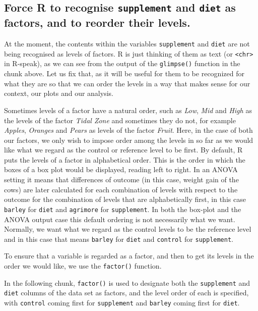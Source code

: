 \documentclass[
  letterpaper,
  DIV=11,
  numbers=noendperiod]{scrreprt}
\begin{document}
\subsection{\texorpdfstring{Force R to recognise \texttt{supplement} and
\texttt{diet} as factors, and to reorder their
levels.}{Force R to recognise supplement and diet as factors, and to reorder their levels.}}\label{force-r-to-recognise-supplement-and-diet-as-factors-and-to-reorder-their-levels.}

At the moment, the contents within the variables \texttt{supplement} and
\texttt{diet} are not being recognised as levels of factors. R is just
thinking of them as text (or \texttt{\textless{}chr\textgreater{}} in
R-speak), as we can see from the output of the \texttt{glimpse()}
function in the chunk above. Let us fix that, as it will be useful for
them to be recognized for what they are so that we can order the levels
in a way that makes sense for our context, our plots and our analysis.

Sometimes levels of a factor have a natural order, such as \emph{Low},
\emph{Mid} and \emph{High} as the levels of the factor \emph{Tidal Zone}
and sometimes they do not, for example \emph{Apples}, \emph{Oranges} and
\emph{Pears} as levels of the factor \emph{Fruit}. Here, in the case of
both our factors, we only wish to impose order among the levels in so
far as we would like what we regard as the control or reference level to
be first. By default, R puts the levels of a factor in alphabetical
order. This is the order in which the boxes of a box plot would be
displayed, reading left to right. In an ANOVA setting it means that
differences of outcome (in this case, weight gain of the cows) are later
calculated for each combination of levels with respect to the outcome
for the combination of levels that are alphabetically first, in this
case \texttt{barley} for \texttt{diet} and \texttt{agrimore} for
\texttt{supplement}. In both the box-plot and the ANOVA output case this
default ordering is not necessarily what we want. Normally, we want what
we regard as the control levels to be the reference level and in this
case that means \texttt{barley} for \texttt{diet} and \texttt{control}
for \texttt{supplement}.

To ensure that a variable is regarded as a factor, and then to get its
levels in the order we would like, we use the \texttt{factor()}
function.

In the following chunk, \texttt{factor()} is used to designate both the
\texttt{supplement} and \texttt{diet} columns of the data set as
factors, and the level order of each is specified, with \texttt{control}
coming first for \texttt{supplement} and \texttt{barley} coming first
for \texttt{diet}.
\end{document}
